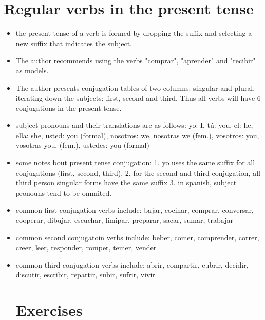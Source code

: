     \section{Regular verbs in the present tense}

    \begin{itemize}
        \item the present tense of a verb is formed by dropping the suffix and selecting a new suffix that indicates the subject.
        \item The author recommends using the verbs "comprar", "aprender" and "recibir" as models.
        \item The author presents conjugation tables of two columns: singular and plural, iterating down the subjects: first, second and third. Thus all verbs will have 6 conjugations in the present tense.
        \item subject pronouns and their translations are as follows: yo: I, tú: you, el: he, ella: she, usted: you (formal), nosotros: we, nosotras we (fem.), vosotros: you, vosotras you, (fem.), ustedes: you (formal)
        \item some notes bout present tense conjugation: 1. yo uses the same suffix for all conjugations (first, second, third), 2. for the second and third conjugation, all third person singular forms have the same suffix 3. in spanish, subject pronouns tend to be ommited.
        \item common first conjugation verbs include: bajar, cocinar, comprar, conversar, cooperar, dibujar, escuchar, limipar, preparar, sacar, sumar, trabajar
        \item common second conjugatoin verbs include: beber, comer, comprender, correr, creer, leer, responder, romper, temer, vender
        \item common third conjugation verbs include: abrir, compartir, cubrir, decidir, discutir, escribir, repartir, subir, sufrir, vivir
    
    \section{Exercises}

    \end{itemize}
